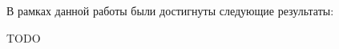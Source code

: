 \documentclass[../diploma.tex]{subfiles}
\begin{document}
В рамках данной работы были достигнуты следующие результаты: 

TODO
\end{document}
